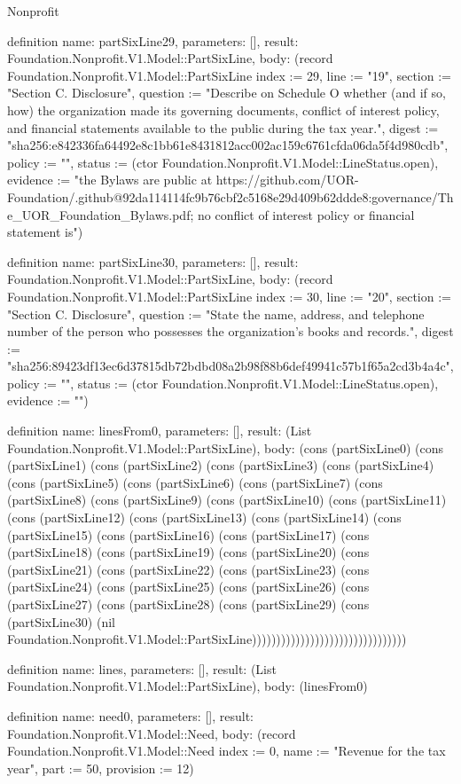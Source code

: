 \begin{lexlean}{Nonprofit}
\begin{semanticmodule}
definition{
  name: partSixLine29,
  parameters: [],
  result: Foundation.Nonprofit.V1.Model::PartSixLine,
  body: (record Foundation.Nonprofit.V1.Model::PartSixLine {index := 29, line := "19", section := "Section C. Disclosure", question := "Describe on Schedule O whether (and if so, how) the organization made its governing documents, conflict of interest policy, and financial statements available to the public during the tax year.", digest := "sha256:e842336fa64492e8c1bb61e8431812acc002ac159c6761cfda06da5f4d980cdb", policy := "", status := (ctor Foundation.Nonprofit.V1.Model::LineStatus.open), evidence := "the Bylaws are public at https://github.com/UOR-Foundation/.github@92da114114fc9b76cbf2c5168e29d409b62ddde8:governance/The_UOR_Foundation_Bylaws.pdf; no conflict of interest policy or financial statement is"})
}

definition{
  name: partSixLine30,
  parameters: [],
  result: Foundation.Nonprofit.V1.Model::PartSixLine,
  body: (record Foundation.Nonprofit.V1.Model::PartSixLine {index := 30, line := "20", section := "Section C. Disclosure", question := "State the name, address, and telephone number of the person who possesses the organization’s books and records.", digest := "sha256:89423df13ec6d37815db72bdbd08a2b98f88b6def49941c57b1f65a2cd3b4a4c", policy := "", status := (ctor Foundation.Nonprofit.V1.Model::LineStatus.open), evidence := ""})
}

definition{
  name: linesFrom0,
  parameters: [],
  result: (List Foundation.Nonprofit.V1.Model::PartSixLine),
  body: (cons (partSixLine0) (cons (partSixLine1) (cons (partSixLine2) (cons (partSixLine3) (cons (partSixLine4) (cons (partSixLine5) (cons (partSixLine6) (cons (partSixLine7) (cons (partSixLine8) (cons (partSixLine9) (cons (partSixLine10) (cons (partSixLine11) (cons (partSixLine12) (cons (partSixLine13) (cons (partSixLine14) (cons (partSixLine15) (cons (partSixLine16) (cons (partSixLine17) (cons (partSixLine18) (cons (partSixLine19) (cons (partSixLine20) (cons (partSixLine21) (cons (partSixLine22) (cons (partSixLine23) (cons (partSixLine24) (cons (partSixLine25) (cons (partSixLine26) (cons (partSixLine27) (cons (partSixLine28) (cons (partSixLine29) (cons (partSixLine30) (nil Foundation.Nonprofit.V1.Model::PartSixLine))))))))))))))))))))))))))))))))
}

definition{
  name: lines,
  parameters: [],
  result: (List Foundation.Nonprofit.V1.Model::PartSixLine),
  body: (linesFrom0)
}

definition{
  name: need0,
  parameters: [],
  result: Foundation.Nonprofit.V1.Model::Need,
  body: (record Foundation.Nonprofit.V1.Model::Need {index := 0, name := "Revenue for the tax year", part := 50, provision := 12})
}


\end{semanticmodule}
\end{lexlean}
